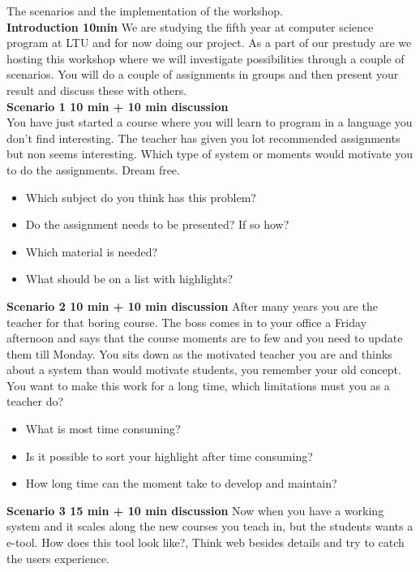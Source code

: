 The scenarios and the implementation of the workshop.\\
\textbf{Introduction 10min}
We are studying the fifth year at computer science program at LTU and for now doing our project. As a part of our prestudy are we hosting this workshop where we will investigate possibilities through a couple of scenarios. You will do a couple of assignments in groups and then present your result and discuss these with others.\\

\textbf{Scenario 1 10 min + 10 min discussion}\\
You have just started a course where you will learn to program in a language you don't find interesting. The teacher has given you lot recommended assignments but non seems interesting. Which type of system or moments would motivate you to do the assignments. Dream free.
\begin{itemize}
\item Which subject do you think has this problem?
\item Do the assignment needs to be presented? If so how?
\item Which material is needed?
\item What should be on a list with highlights?
\end{itemize} 

\textbf{Scenario 2 10 min + 10 min discussion}
After many years you are the teacher for that boring course. The boss comes in to your office a Friday afternoon and says that the course moments are to few and you need to update them till Monday. You sits down as the motivated teacher you are and thinks about a system than would motivate students, you remember your old concept. \\
You want to make this work for a long time, which limitations must you as a teacher do?\\
\begin{itemize}
\item What is most time consuming?
\item Is it possible to sort your highlight after time consuming?
\item How long time can the moment take to develop and maintain?
\end{itemize} 

\textbf{Scenario 3 15 min + 10 min discussion}
Now when you have a working system and it scales along the new courses you teach in, but the students wants a e-tool. How does this tool look like?, Think web besides details and try to catch the users experience.

